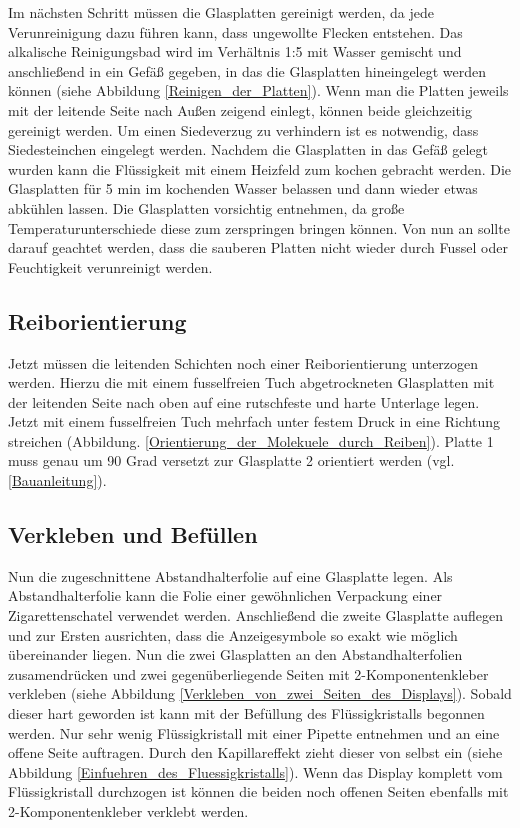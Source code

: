 
Im nächsten Schritt müssen die Glasplatten gereinigt werden, da jede Verunreinigung dazu führen kann, dass ungewollte Flecken entstehen.
Das alkalische Reinigungsbad wird im Verhältnis 1:5 mit Wasser gemischt und anschließend in ein Gefäß gegeben, in das die Glasplatten hineingelegt werden können (siehe Abbildung \ref{Reinigen_der_Platten}). Wenn man die Platten jeweils mit der leitende Seite nach Außen zeigend einlegt, können beide gleichzeitig gereinigt werden. Um einen Siedeverzug zu verhindern ist es notwendig, dass Siedesteinchen eingelegt werden. Nachdem die Glasplatten in das Gefäß gelegt wurden kann die Flüssigkeit mit einem Heizfeld zum kochen gebracht werden. Die Glasplatten für 5 min im kochenden Wasser belassen und dann wieder etwas abkühlen lassen. Die Glasplatten vorsichtig entnehmen, da große Temperaturunterschiede diese zum zerspringen bringen können.
Von nun an sollte darauf geachtet werden, dass die sauberen Platten nicht wieder durch Fussel oder Feuchtigkeit verunreinigt werden.

\subsection{Reiborientierung}

Jetzt müssen die leitenden Schichten noch einer Reiborientierung unterzogen werden. Hierzu die mit einem fusselfreien Tuch abgetrockneten Glasplatten mit der leitenden Seite nach oben auf eine rutschfeste und harte Unterlage legen. Jetzt mit einem fusselfreien Tuch mehrfach unter festem Druck in eine Richtung streichen (Abbildung. \ref{Orientierung_der_Molekuele_durch_Reiben}). Platte 1 muss genau um 90 Grad versetzt zur Glasplatte 2 orientiert werden (vgl. \ref{Bauanleitung}).

\subsection{Verkleben und Befüllen}

Nun die zugeschnittene Abstandhalterfolie auf eine Glasplatte legen. Als Abstandhalterfolie kann die Folie einer gewöhnlichen Verpackung einer Zigarettenschatel verwendet werden. 
Anschließend die zweite Glasplatte auflegen und zur Ersten ausrichten, dass die Anzeigesymbole so exakt wie möglich übereinander liegen. Nun die zwei Glasplatten an den Abstandhalterfolien zusamendrücken und zwei gegenüberliegende Seiten mit 2-Komponentenkleber verkleben (siehe Abbildung \ref{Verkleben_von_zwei_Seiten_des_Displays}). Sobald dieser hart geworden ist kann mit der Befüllung des Flüssigkristalls begonnen werden.
Nur sehr wenig Flüssigkristall mit einer Pipette entnehmen und an eine offene Seite auftragen. Durch den Kapillareffekt zieht dieser von selbst ein (siehe Abbildung \ref{Einfuehren_des_Fluessigkristalls}). Wenn das Display komplett vom Flüssigkristall durchzogen ist können die beiden noch offenen Seiten ebenfalls mit 2-Komponentenkleber verklebt werden.\\

